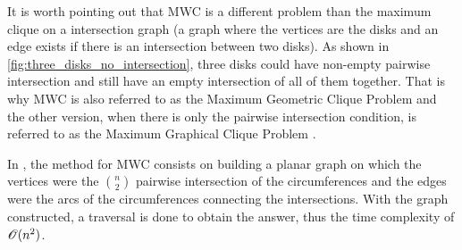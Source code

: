 It is worth pointing out that MWC is a different problem than the maximum clique on a intersection graph (a graph where the vertices are the disks and an edge exists if there is an intersection between two disks). 
As shown in \autoref{fig:three_disks_no_intersection}, three disks could have non-empty pairwise intersection and still have an empty intersection of all of them together.
That is why MWC is also referred to as the Maximum Geometric Clique Problem and the other version, when there is only the pairwise intersection condition, is referred to as the Maximum Graphical Clique Problem \cite{inplace:2014}. 


In , the method for MWC consists on building a planar graph on which the vertices were the $\binom{n}{2}$ pairwise intersection of the circumferences and the edges were the arcs of the circumferences connecting the intersections. With the graph constructed, a traversal is done to obtain the answer, thus the time complexity of $\mathscr{O}(n^2)$.

